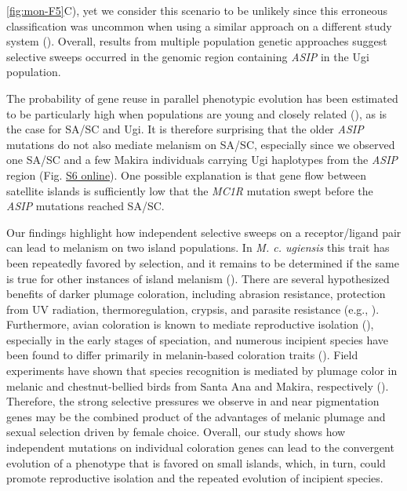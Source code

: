 \ref{fig:mon-F5}C), yet we consider this scenario to be unlikely since this erroneous classification was uncommon when using a similar approach on a different study system (\cite{hejase_genomic_2020}). Overall, results from multiple population genetic approaches suggest selective sweeps occurred in the genomic region containing \textit{ASIP} in the Ugi population.

The probability of gene reuse in parallel phenotypic evolution has been estimated to be particularly high when populations are young and closely related (\cite{conte2012probability}), as is the case for \ac{SA/SC} and Ugi. It is therefore surprising that the older \textit{ASIP} mutations do not also mediate melanism on \ac{SA/SC}, especially since we observed one \ac{SA/SC} and a few Makira individuals carrying Ugi haplotypes from the \textit{ASIP} region (Fig. \href{https://journals.plos.org/PLOSGENETICS/article?id=10.1371/journal.pgen.1010474#sec017}{S6 online}). One possible explanation is that gene flow between satellite islands is sufficiently low that the \textit{MC1R} mutation swept before the \textit{ASIP} mutations reached \ac{SA/SC}.

Our findings highlight how independent selective sweeps on a receptor/ligand pair can lead to melanism on two island populations. In \textit{M. c. ugiensis} this trait has been repeatedly favored by selection, and it remains to be determined if the same is true for other instances of island melanism (\cite{theron2001molecular,walsh2021patterns,uy2015island}). There are several hypothesized benefits of darker plumage coloration, including abrasion resistance, protection from UV radiation, thermoregulation, crypsis, and parasite resistance (e.g., \cite{jacquin2011melanin,marcondes2021rethinking}). Furthermore, avian coloration is known to mediate reproductive isolation (\cite{price2007speciation}), especially in the early stages of speciation, and numerous incipient species have been found to differ primarily in melanin-based coloration traits (\cite{poelstra2014genomic,uy2018behavioral,turbek_rapid_2021,semenov2021asymmetric,bourgeois2017novel}). Field experiments have shown that species recognition is mediated by plumage color in melanic and chestnut-bellied birds from Santa Ana and Makira, respectively (\cite{uy2009difference,uy2013variation}). Therefore, the strong selective pressures we observe in and near pigmentation genes may be the combined product of the advantages of melanic plumage and sexual selection driven by female choice. Overall, our study shows how independent mutations on individual coloration genes can lead to the convergent evolution of a phenotype that is favored on small islands, which, in turn, could promote reproductive isolation and the repeated evolution of incipient species.

